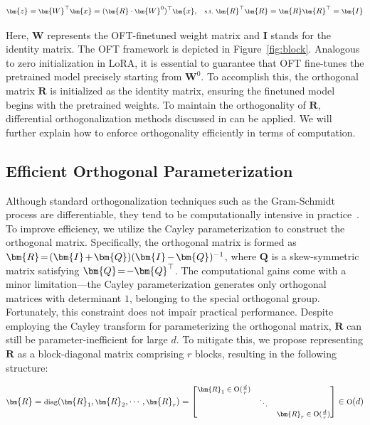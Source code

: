 \begin{equation}\label{eq:oft_general}
    \footnotesize
    \bm{z}=\bm{W}^\top\bm{x}=(\bm{R}\cdot\bm{W}^0)^\top\bm{x},~~~\text{s.t.}~\bm{R}^\top\bm{R}=\bm{R}\bm{R}^\top=\bm{I}
\end{equation}

Here, $\bm{W}$ represents the OFT-finetuned weight matrix and $\bm{I}$ stands for the identity matrix. The OFT framework is depicted in Figure~\ref{fig:block}. Analogous to zero initialization in LoRA, it is essential to guarantee that OFT fine-tunes the pretrained model precisely starting from $\bm{W}^0$. To accomplish this, the orthogonal matrix $\bm{R}$ is initialized as the identity matrix, ensuring the finetuned model begins with the pretrained weights. To maintain the orthogonality of $\bm{R}$, differential orthogonalization methods discussed in \cite{liu2021orthogonal,lezcano2019cheap} can be applied. We will further explain how to enforce orthogonality efficiently in terms of computation.

\subsection{Efficient Orthogonal Parameterization}\label{sect:eff_ortho}

Although standard orthogonalization techniques such as the Gram-Schmidt process are differentiable, they tend to be computationally intensive in practice~\cite{liu2021orthogonal}. To improve efficiency, we utilize the Cayley parameterization to construct the orthogonal matrix. Specifically, the orthogonal matrix is formed as $\thickmuskip=2mu \medmuskip=2mu \bm{R}=(\bm{I}+\bm{Q})(\bm{I}-\bm{Q})^{-1}$, where $\bm{Q}$ is a skew-symmetric matrix satisfying $\thickmuskip=2mu \medmuskip=2mu \bm{Q}=-\bm{Q}^\top$. The computational gains come with a minor limitation—the Cayley parameterization generates only orthogonal matrices with determinant $1$, belonging to the special orthogonal group. Fortunately, this constraint does not impair practical performance. Despite employing the Cayley transform for parameterizing the orthogonal matrix, $\bm{R}$ can still be parameter-inefficient for large $d$. To mitigate this, we propose representing $\bm{R}$ as a block-diagonal matrix comprising $r$ blocks, resulting in the following structure:

\begin{equation}
    \footnotesize
    \bm{R}=\text{diag}(\bm{R}_1,\bm{R}_2,\cdots,\bm{R}_r)=\begin{bmatrix}
    \bm{R}_1\in \text{O}(\frac{d}{r}) &  &\\
    &\ddots & \\
    & & \bm{R}_r\in \text{O}(\frac{d}{r})
    \end{bmatrix}\in \text{O}(d)
\end{equation}

